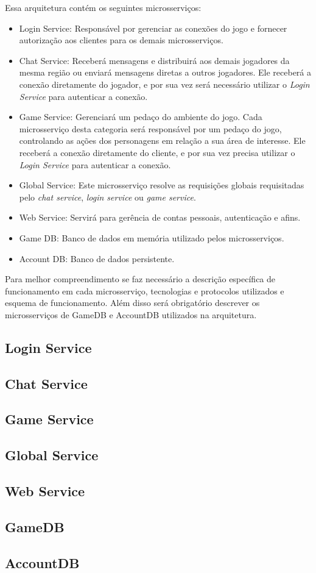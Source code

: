 Essa arquitetura contém os seguintes microsserviços:

\begin{itemize}
\item Login Service: Responsável por gerenciar as conexões do jogo e fornecer autorização aos clientes para os demais microsserviços.
  \item Chat Service: Receberá mensagens e distribuirá aos demais jogadores da mesma região ou enviará mensagens diretas a outros jogadores. Ele receberá a conexão diretamente do jogador, e por sua vez será necessário utilizar o \textit{Login Service} para autenticar a conexão.
  \item Game Service: Gerenciará um pedaço do ambiente do jogo. Cada microsserviço desta categoria será responsável por um pedaço do jogo, controlando as ações dos personagens em relação a sua área de interesse. Ele receberá a conexão diretamente do cliente, e por sua vez precisa utilizar o \textit{Login Service} para autenticar a conexão.
  \item Global Service: Este microsserviço resolve as requisições globais requisitadas pelo \textit{chat service}, \textit{login service} ou \textit{game service}.
  \item Web Service: Servirá para gerência de contas pessoais, autenticação e afins.
  \item Game DB: Banco de dados em memória utilizado pelos microsserviços.
  \item Account DB: Banco de dados persistente.
\end{itemize}


Para melhor compreendimento se faz necessário a descrição específica de funcionamento em cada microsserviço, tecnologias e protocolos utilizados e esquema de funcionamento.
%
Além disso será obrigatório descrever os microsserviços de GameDB e AccountDB utilizados na arquitetura.

\subsection{Login Service}

\subsection{Chat Service}

\subsection{Game Service}

\subsection{Global Service}

\subsection{Web Service}

\subsection{GameDB}

\subsection{AccountDB}


